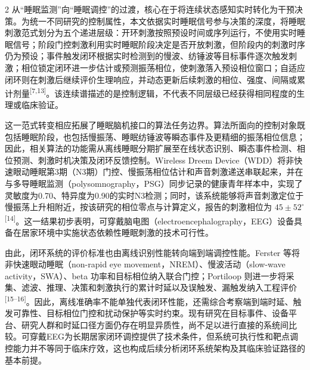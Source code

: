 \documentclass[UTF8,zihao=5,fontset=none]{ctexart}
\newcommand{\hei}{\CJKfamily{hei}}
\newcommand{\leveltwo}[1]{%
  \par\noindent{\hei\fontsize{10.5pt}{15.6pt}\selectfont\bfseries #1\par}}
\newcommand{\refcite}[1]{\nolinebreak[4]\textsuperscript{[#1]}}
\begin{document}
\begin{multicols}{2}
从“睡眠监测”向“睡眠调控”的过渡，核心在于将连续状态感知实时转化为干预决策。为统一不同研究的控制属性，本文依据实时睡眠信号参与决策的深度，将睡眠刺激范式划分为五个递进层级：开环刺激按照预设时间或序列运行，不使用实时睡眠信号；阶段门控刺激利用实时睡眠阶段决定是否开放刺激，但阶段内的刺激时序仍为预设；事件触发闭环根据实时检测到的慢波、纺锤波等目标事件逐次触发刺激；相位锁定闭环进一步估计或预测振荡相位，使刺激落入预设相位窗口；自适应闭环则在刺激后继续评价生理响应，并动态更新后续刺激的相位、强度、间隔或累计剂量\refcite{7,13}。该连续谱描述的是控制逻辑，不代表不同层级已经获得相同程度的生理或临床验证。

这一范式转变相应拓展了睡眠脑机接口的算法任务边界。算法所面向的控制对象既包括睡眠阶段，也包括慢振荡、睡眠纺锤波等瞬态事件及更精细的振荡相位信息；因此，相关算法的功能需从离线睡眠分期扩展至在线状态识别、瞬态事件检测、相位预测、刺激时机决策及闭环反馈控制。Wireless Dreem Device（WDD）将非快速眼动睡眠第3期（N3期）门控、慢振荡相位估计和声音刺激递送串联起来，并在与多导睡眠监测（polysomnography，PSG）同步记录的健康青年样本中，实现了灵敏度为0.70、特异度为0.90的实时N3检测；同时，该系统能够将声音刺激定位于慢振荡上升相附近，按该研究的相位零点与计算定义，报告的刺激相位为 $45\pm52^{\circ}$\refcite{14}。这一结果初步表明，可穿戴脑电图（electroencephalography，EEG）设备具备在居家环境中实施状态依赖性睡眠刺激的技术可行性。

由此，闭环系统的评价标准也由离线识别性能转向端到端调控性能。Ferster 等将非快速眼动睡眠（non-rapid eye movement，NREM）、慢波活动（slow-wave activity，SWA）、beta 功率和目标相位纳入联合门控；Portiloop 则进一步将采集、滤波、推理、决策和刺激执行的累计时延以及误触发、漏触发纳入工程评价\refcite{15--16}。因此，离线准确率不能单独代表闭环性能，还需综合考察端到端时延、触发可靠性、目标相位门控和扰动保护等实时约束。现有研究在目标事件、设备平台、研究人群和时延口径方面仍存在明显异质性，尚不足以进行直接的系统间比较。可穿戴EEG为长期居家闭环调控提供了技术条件，但系统可执行性和靶点调控能力并不等同于临床疗效，这也构成后续分析闭环系统架构及其临床验证路径的基本前提。

\leveltwo{1.3 闭环睡眠干预系统的基本架构}


\end{multicols}
\end{document}
